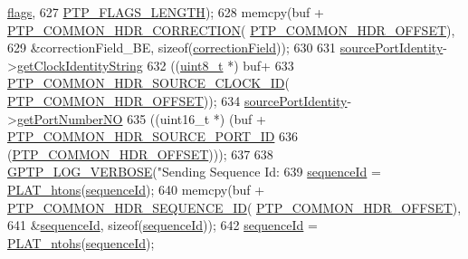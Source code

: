 \begin{DoxyCode}
      \hyperlink{class_p_t_p_message_common_a8c2f6104634deb80d932fa0cd9166fba}{flags},
627            \hyperlink{avbts__message_8hpp_ad8b20c17c21a3024f129fc556d5382c2}{PTP\_FLAGS\_LENGTH});
628     memcpy(buf + \hyperlink{avbts__message_8hpp_a86a729fd44989d68c1ebe5c385839743}{PTP\_COMMON\_HDR\_CORRECTION}(
      \hyperlink{avbts__message_8hpp_a330dd502b6e19949d74c8f3a96dd5667}{PTP\_COMMON\_HDR\_OFFSET}),
629            &correctionField\_BE, \textcolor{keyword}{sizeof}(\hyperlink{class_p_t_p_message_common_a635b707dac6610b5b159be5c8ec1891e}{correctionField}));
630 
631     \hyperlink{class_p_t_p_message_common_a415b5544bdd3ea41dae460fa1af900d9}{sourcePortIdentity}->\hyperlink{class_port_identity_a2047fe8013d08f14ac579d604e2efd7e}{getClockIdentityString}
632       ((\hyperlink{stdint_8h_aba7bc1797add20fe3efdf37ced1182c5}{uint8\_t} *) buf+
633        \hyperlink{avbts__message_8hpp_ac56d471778da7bf419e64ecf2103ad9b}{PTP\_COMMON\_HDR\_SOURCE\_CLOCK\_ID}(
      \hyperlink{avbts__message_8hpp_a330dd502b6e19949d74c8f3a96dd5667}{PTP\_COMMON\_HDR\_OFFSET}));
634     \hyperlink{class_p_t_p_message_common_a415b5544bdd3ea41dae460fa1af900d9}{sourcePortIdentity}->\hyperlink{class_port_identity_ae22242effe1001dc666522e6019fd494}{getPortNumberNO}
635       ((uint16\_t *) (buf + \hyperlink{avbts__message_8hpp_a53a15a915e51af626e90665cbcc6c443}{PTP\_COMMON\_HDR\_SOURCE\_PORT\_ID}
636              (\hyperlink{avbts__message_8hpp_a330dd502b6e19949d74c8f3a96dd5667}{PTP\_COMMON\_HDR\_OFFSET})));
637 
638     \hyperlink{gptp__log_8hpp_add03384a2a8099b27e07d041cce77e6f}{GPTP\_LOG\_VERBOSE}(\textcolor{stringliteral}{"Sending Sequence Id: %
639     \hyperlink{class_p_t_p_message_common_a189710d5cff10c03f77d72a276a5f58e}{sequenceId} = \hyperlink{linux_2src_2platform_8cpp_aa89fc0aa7465274c200da69771d2a043}{PLAT\_htons}(\hyperlink{class_p_t_p_message_common_a189710d5cff10c03f77d72a276a5f58e}{sequenceId});
640     memcpy(buf + \hyperlink{avbts__message_8hpp_af717ee08477f9388e66fc5451971e6af}{PTP\_COMMON\_HDR\_SEQUENCE\_ID}(
      \hyperlink{avbts__message_8hpp_a330dd502b6e19949d74c8f3a96dd5667}{PTP\_COMMON\_HDR\_OFFSET}),
641            &\hyperlink{class_p_t_p_message_common_a189710d5cff10c03f77d72a276a5f58e}{sequenceId}, \textcolor{keyword}{sizeof}(\hyperlink{class_p_t_p_message_common_a189710d5cff10c03f77d72a276a5f58e}{sequenceId}));
642     \hyperlink{class_p_t_p_message_common_a189710d5cff10c03f77d72a276a5f58e}{sequenceId} = \hyperlink{linux_2src_2platform_8cpp_a6b8f3e7b87b66fa774a07ddc67f883a7}{PLAT\_ntohs}(\hyperlink{class_p_t_p_message_common_a189710d5cff10c03f77d72a276a5f58e}{sequenceId});
}
\end{DoxyCode}
